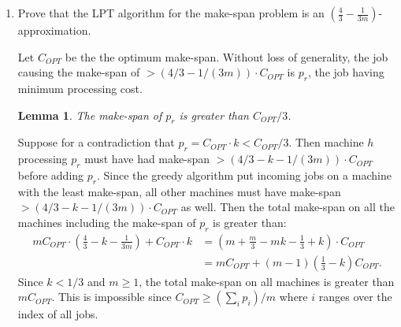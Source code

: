 \documentclass[11pt]{article}
\newcommand\E{\mathbb{E}}
\newtheorem{lemma}[theorem]{Lemma}
\begin{document}
\begin{enumerate}
\begin{comment}
Observe that if item $t_M$ was the $i^{th}$ item in the random sequence then the minimum make-span $C_{OBT}$ obtained by the greedy algorithm satisfies:
\[C_{OBT} \geq 2m + \frac{i-1}{2m} - 1\]
since the shortest stack after adding $i-1$ items of make-span one is \[\left\lfloor\frac{i-1}{2m}\right\rfloor \geq \frac{i-1}{2m} - 1\]
Now that we have a lower bound on the minimum make-span when $t_M$ is the $i^{th}$ item added we can calculated the expected minimum make-span over all $1 \leq i \leq M$:
\begin{align}
\E[C_{OBT}] &\geq \frac{1}{M}\sum_{i=0}^{M-1}\left(2m + \frac{i}{2m} - 1\right)\\
&= 2m - 1 + \frac{1}{2mM}\left(\sum_{i=0}^{M-1}i\right) \\
&= 2m - 1 + \frac{1}{2mM}\frac{M(M-1)}{2} \\
&= 2m - 1 + \frac{2m(2m-1)}{4m}\\
&= \left(2 - \frac{1}{m}\right) \cdot 2m = \left(2 - \frac{1}{m}\right) \cdot C_{OPT}
\end{align}
Thus the expected make-span is greater than or equal to $(2 - 1/m)$ times $C_{OPT}$ as required. 
\end{comment}
\item Prove that the LPT algorithm for the make-span problem is an $\left(\frac{4}{3} - \frac{1}{3m}\right)$-approximation.
\begin{prf}
Let $C_{OPT}$ be the the optimum make-span. Without loss of generality, the job causing the make-span of $> (4/3 - 1/(3m)) \cdot C_{OPT}$ is $p_r$, the job having minimum processing cost. 

\begin{lemma}
The make-span of $p_r$ is greater than $C_{OPT}/3$.
\end{lemma}
\begin{prf}
Suppose for a contradiction that $p_r  = C_{OPT} \cdot k < C_{OPT}/3$. Then machine $h$ processing $p_r$ must have had make-span $> (4/3 - k - 1/(3m))\cdot C_{OPT}$ before adding $p_r$. Since the greedy algorithm put incoming jobs on a machine with the least make-span, all other machines must have make-span $>(4/3 - k - 1/(3m))\cdot C_{OPT}$ as well. Then the total make-span on all the machines including the make-span of $p_r$ is greater than:
\begin{align*}
mC_{OPT} \cdot \left(\frac{4}{3} - k - \frac{1}{3m}\right) + C_{OPT} \cdot k &= \left(m + \frac{m}{3} - mk - \frac{1}{3} + k\right) \cdot C_{OPT}\\
&= mC_{OPT} + (m-1)\left( \frac{1}{3} - k \right)C_{OPT}.
\end{align*}
Since $k < 1/3$ and $m \geq 1$, the total make-span on all machines is greater than $mC_{OPT}$. This is impossible since $C_{OPT} \geq (\sum_{i} p_i)/m$ where $i$ ranges over the index of all jobs.
\end{prf}


\end{prf}
\end{enumerate}
\end{document}
